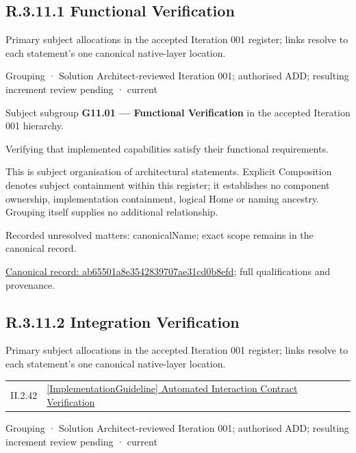 \subsection*{R.3.11.1 Functional Verification}
\label{navigation:R.3.11.1}

Primary subject allocations in the accepted Iteration 001 register; links resolve to each statement’s one canonical native-layer location.\par
\label{element:ab65501a8e3542839707ae31cd0b8efd}
{\small Grouping · Solution Architect-reviewed Iteration 001; authorised ADD; resulting increment review pending · current}\par

Subject subgroup \textbf{G11.01 — Functional Verification} in the accepted Iteration 001 hierarchy.



Verifying that implemented capabilities satisfy their functional requirements.



This is subject organisation of architectural statements. Explicit Composition denotes subject containment within this register; it establishes no component ownership, implementation containment, logical Home or naming ancestry. Grouping itself supplies no additional relationship.


{\small Recorded unresolved matters: canonicalName; exact scope remains in the canonical record.}\par
{\footnotesize \href{../../../../continuum/grouping/ab65501a8e3542839707ae31cd0b8efd.md}{Canonical record: ab65501a8e3542839707ae31cd0b8efd}; full qualifications and provenance.}\par
\subsection*{R.3.11.2 Integration Verification}
\label{navigation:R.3.11.2}

Primary subject allocations in the accepted Iteration 001 register; links resolve to each statement’s one canonical native-layer location.\par
\begin{longtable}{p{.22\linewidth}p{.73\linewidth}}
II.2.42 & \hyperref[element:a6c8cc8f5647461cb210f88ced90cc57]{[ImplementationGuideline] Automated Interaction Contract Verification} \\
\end{longtable}
\label{element:e8c7f8a36ff248cd9115d7a382324808}
{\small Grouping · Solution Architect-reviewed Iteration 001; authorised ADD; resulting increment review pending · current}\par

